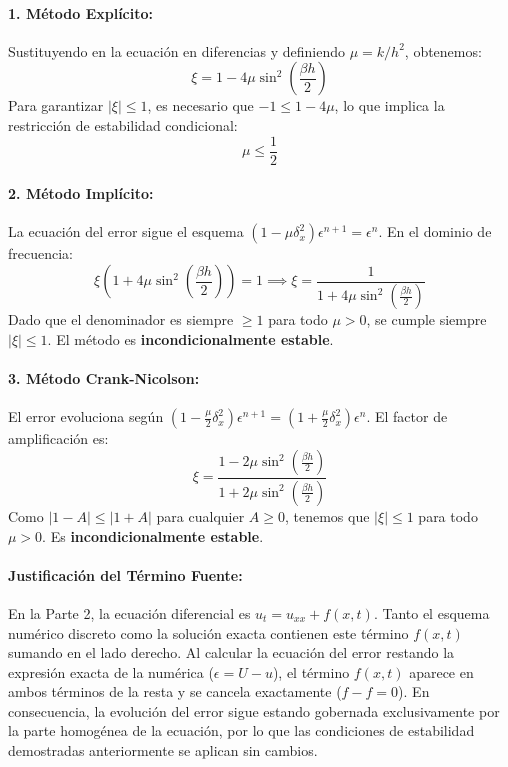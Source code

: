 \documentclass{article}
\begin{document}
\paragraph{1. Método Explícito:}
Sustituyendo en la ecuación en diferencias y definiendo \(\mu = k/h^2\), obtenemos:
\[ \xi = 1 - 4\mu \sin^2\left(\frac{\beta h}{2}\right) \]
Para garantizar \( |\xi| \le 1 \), es necesario que \( -1 \le 1 - 4\mu \), lo que implica la restricción de estabilidad condicional:
\[ \mu \le \frac{1}{2} \]

\paragraph{2. Método Implícito:}
La ecuación del error sigue el esquema \( (1 - \mu \delta_x^2) \epsilon^{n+1} = \epsilon^n \). En el dominio de frecuencia:
\[ \xi \left(1 + 4\mu \sin^2\left(\frac{\beta h}{2}\right)\right) = 1 \implies \xi = \frac{1}{1 + 4\mu \sin^2(\frac{\beta h}{2})} \]
Dado que el denominador es siempre \(\ge 1\) para todo \(\mu > 0\), se cumple siempre \( |\xi| \le 1 \). El método es \textbf{incondicionalmente estable}.

\paragraph{3. Método Crank-Nicolson:}
El error evoluciona según \( (1 - \frac{\mu}{2} \delta_x^2) \epsilon^{n+1} = (1 + \frac{\mu}{2} \delta_x^2) \epsilon^n \). El factor de amplificación es:
\[ \xi = \frac{1 - 2\mu \sin^2(\frac{\beta h}{2})}{1 + 2\mu \sin^2(\frac{\beta h}{2})} \]
Como \( |1 - A| \le |1 + A| \) para cualquier \(A \ge 0\), tenemos que \( |\xi| \le 1 \) para todo \(\mu > 0\). Es \textbf{incondicionalmente estable}.

\paragraph{Justificación del Término Fuente:}
En la Parte 2, la ecuación diferencial es \( u_t = u_{xx} + f(x,t) \). Tanto el esquema numérico discreto como la solución exacta contienen este término \( f(x,t) \) sumando en el lado derecho.
Al calcular la ecuación del error restando la expresión exacta de la numérica (\( \epsilon = U - u \)), el término \( f(x,t) \) aparece en ambos términos de la resta y se cancela exactamente (\( f - f = 0 \)).
En consecuencia, la evolución del error sigue estando gobernada exclusivamente por la parte homogénea de la ecuación, por lo que las condiciones de estabilidad demostradas anteriormente se aplican sin cambios.
\end{document}
